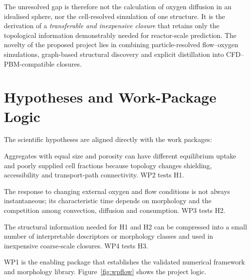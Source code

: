 \documentclass[11pt,a4paper]{article}
\begin{document}
The unresolved gap is therefore not the calculation of oxygen diffusion in an
idealised sphere, nor the cell-resolved simulation of one structure. It is the
derivation of a \emph{transferable and inexpensive closure} that retains only
the topological information demonstrably needed for reactor-scale prediction.
The novelty of the proposed project lies in combining particle-resolved
flow--oxygen simulations, graph-based structural discovery and explicit
distillation into CFD--PBM-compatible closures.

\section{Hypotheses and Work-Package Logic}

The scientific hypotheses are aligned directly with the work packages:

\begin{description}[style=nextline]
  \item[H1: Steady structure--transport relationship.]
  Aggregates with equal size and porosity can have different equilibrium
  uptake and poorly supplied cell fractions because topology changes shielding,
  accessibility and transport-path connectivity. WP2 tests H1.

  \item[H2: Morphology-dependent oxygen memory.]
  The response to changing external oxygen and flow conditions is not always
  instantaneous; its characteristic time depends on morphology and the
  competition among convection, diffusion and consumption. WP3 tests H2.

  \item[H3: Reducible topological information.]
  The structural information needed for H1 and H2 can be compressed into a
  small number of interpretable descriptors or morphology classes and used in
  inexpensive coarse-scale closures. WP4 tests H3.
\end{description}

WP1 is the enabling package that establishes the validated numerical framework
and morphology library. Figure~\ref{fig:wpflow} shows the project logic.
\end{document}
